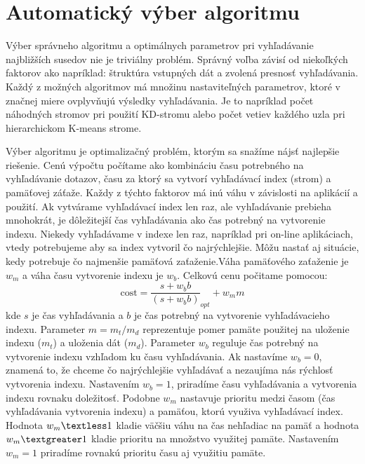 \documentclass[12pt,oneside]{fithesis2}
\begin{document}
	\section{Automatický výber algoritmu}\label{sec:autotuning}
	Výber správneho algoritmu a optimálnych parametrov pri vyhľadávanie najbližších susedov nie je triviálny problém. Správný voľba závisí od niekoľkých faktorov ako napríklad: štruktúra vstupných dát a zvolená presnosť vyhľadávania. Každý z možných algoritmov má množinu nastaviteľných parametrov, ktoré v značnej miere ovplyvňujú výsledky vyhľadávania. Je to napríklad počet náhodných stromov pri použití KD-stromu alebo počet vetiev každého uzla pri hierarchickom K-means strome. \cite{muja_flann_2009} 
	
	Výber algoritmu je optimalizačný problém, ktorým sa snažíme nájsť najlepšie riešenie. Cenú výpočtu počítame ako kombináciu času potrebného na vyhľadávanie dotazov, času za ktorý sa vytvorí vyhľadávací index (strom) a pamäťovej záťaže. Každy z týchto faktorov má inú váhu v závislosti na aplikácií a použití. Ak vytvárame vyhľadávací index len raz, ale vyhľadávanie prebieha mnohokrát, je dôležitejší čas vyhľadávania ako čas potrebný na vytvorenie indexu. Niekedy vyhľadávame v indexe len raz, napríklad pri on-line aplikáciach, vtedy potrebujeme aby sa index vytvoril čo najrýchlejšie. Môžu nastať aj situácie, kedy potrebuje čo najmenšie pamäťová zaťaženie.Váha pamäťového zaťaženie je $w_m$ a váha času vytvorenie indexu je $w_b$. Celkovú cenu počitame pomocou:
	\begin{equation}
	\mathrm{cost} = \dfrac{s + w_bb}{(s + w_bb)}_{opt} + w_mm
	\label{cena}
	\end{equation}
kde $s$ je čas vyhľadávania a $b$ je čas potrebný na vytvorenie vyhľadávacieho indexu. Parameter $m = m_t/m_d$ reprezentuje pomer pamäte použitej na uloženie indexu ($m_t$) a uloženia dát ($m_d$). Parameter $w_b$ reguluje čas potrebný na vytvorenie indexu vzhľadom ku času vyhľadávania. Ak nastavíme $w_b = 0$, znamená to, že chceme čo najrýchlejšie vyhľadávať a nezaujíma nás rýchlosť vytvorenia indexu. Nastavením $w_b = 1$, priradíme času vyhľadávania a vytvorenia indexu rovnaku doležitosť. Podobne $w_m$ nastavuje prioritu medzi časom (čas vyhľadávania vytvorenia indexu) a pamäťou, ktorú využiva vyhľadávací index. Hodnota $w_m \textless 1$ kladie väčšiu váhu na čas nehľadiac na pamäť a hodnota $w_m \textgreater 1$  kladie prioritu na množstvo využitej pamäte. Nastavením $w_m = 1$ priradíme rovnakú prioritu času aj využitiu pamäte. \cite{muja_flann_2009} 
\end{document}
